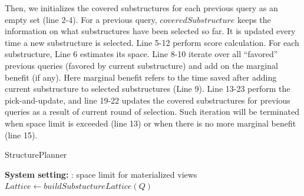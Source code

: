 Then, we initializes the covered substructures for each previous query as an empty set (line 2-4). For a previous query, $coveredSubstructure$ keeps the information on what substructures have been selected so far. %
It is updated every time a new substructure is selected. Line 5-12 perform score calculation. For each substructure, Line 6 estimates its space. Line 8-10 iterate over all ``favored'' previous queries (favored by current substructure) and add on the marginal benefit (if any). Here marginal benefit refers to the time saved after adding current substructure to selected substructures (Line 9). Line 13-23 perform the pick-and-update, and line 19-22 updates the covered substructures for previous queries as a result of current round of selection. Such iteration will be terminated when space limit is exceeded (line 13) or when there is no more marginal benefit (line 15).

\begin{algorithm}%
\label{alg:StructurePlanner}
\caption{StructurePlanner}
\LinesNumbered
\textbf{System setting:} \sigma: space limit for materialized views\\
$Lattice \leftarrow buildSubstuctureLattice(Q)$\;
\end{algorithm}


